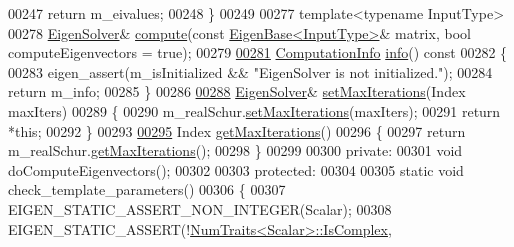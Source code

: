 \begin{DoxyCode}
00247       \textcolor{keywordflow}{return} m\_eivalues;
00248     \}
00249 
00277     \textcolor{keyword}{template}<\textcolor{keyword}{typename} InputType>
00278     \hyperlink{group___eigenvalues___module_class_eigen_1_1_eigen_solver}{EigenSolver}& \hyperlink{group___eigenvalues___module_a38d032b75b3e75640e3db42e7ab20c24}{compute}(\textcolor{keyword}{const} \hyperlink{group___core___module_struct_eigen_1_1_eigen_base}{EigenBase<InputType>}& matrix, \textcolor{keywordtype}{bool} 
      computeEigenvectors = \textcolor{keyword}{true});
00279 
\hyperlink{group___eigenvalues___module_ac4af54fadc33abcdd1778c87bfbf005b}{00281}     \hyperlink{group__enums_ga85fad7b87587764e5cf6b513a9e0ee5e}{ComputationInfo} \hyperlink{group___eigenvalues___module_ac4af54fadc33abcdd1778c87bfbf005b}{info}()\textcolor{keyword}{ const}
00282 \textcolor{keyword}{    }\{
00283       eigen\_assert(m\_isInitialized && \textcolor{stringliteral}{"EigenSolver is not initialized."});
00284       \textcolor{keywordflow}{return} m\_info;
00285     \}
00286 
\hyperlink{group___eigenvalues___module_a6cff220aadfd8d8c1366b915ddefd164}{00288}     \hyperlink{group___eigenvalues___module_class_eigen_1_1_eigen_solver}{EigenSolver}& \hyperlink{group___eigenvalues___module_a6cff220aadfd8d8c1366b915ddefd164}{setMaxIterations}(Index maxIters)
00289     \{
00290       m\_realSchur.\hyperlink{group___eigenvalues___module_ad189e8776ee20a12046694f98b354322}{setMaxIterations}(maxIters);
00291       \textcolor{keywordflow}{return} *\textcolor{keyword}{this};
00292     \}
00293 
\hyperlink{group___eigenvalues___module_aa7668af4bcb47cd92cfe10640589d88f}{00295}     Index \hyperlink{group___eigenvalues___module_aa7668af4bcb47cd92cfe10640589d88f}{getMaxIterations}()
00296     \{
00297       \textcolor{keywordflow}{return} m\_realSchur.\hyperlink{group___eigenvalues___module_a99453076a9617a6af353b5b1f3220c25}{getMaxIterations}();
00298     \}
00299 
00300   \textcolor{keyword}{private}:
00301     \textcolor{keywordtype}{void} doComputeEigenvectors();
00302 
00303   \textcolor{keyword}{protected}:
00304     
00305     \textcolor{keyword}{static} \textcolor{keywordtype}{void} check\_template\_parameters()
00306     \{
00307       EIGEN\_STATIC\_ASSERT\_NON\_INTEGER(Scalar);
00308       EIGEN\_STATIC\_ASSERT(!\hyperlink{group___core___module_struct_eigen_1_1_num_traits}{NumTraits<Scalar>::IsComplex}, 

\end{DoxyCode}
